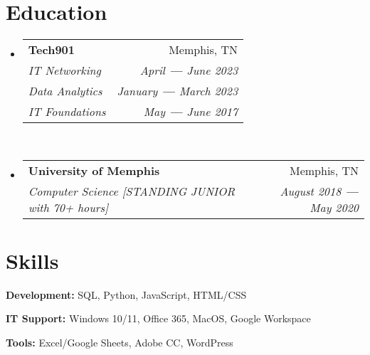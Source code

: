 \documentclass[letterpaper,10pt]{article}
\makeatletter
\newcommand{\resumeSubheading}[4]{\vspace{-2pt}\item
	\begin{tabular*}{0.97\textwidth}[t]{l@{\extracolsep{\fill}}r}
		\textbf{#1} & #2 \\
		\textit{\small#3} & \textit{\small #4} \\
	\end{tabular*}\vspace{-7pt}
}
\newcommand{\resumeEducationHeading}[8]{
	\vspace{-2pt}\item
	\begin{tabular*}{0.97\textwidth}[t]{l@{\extracolsep{\fill}}r}
		\textbf{#1} & #2 \\
		\textit{\small#3} & \textit{\small #4} \\
		\textit{\small#5} & \textit{\small #6} \\
		\textit{\small#7} & \textit{\small #8} \\
	\end{tabular*}\vspace{-5pt}
}
\newcommand{\resumeSubHeadingListStart}{\begin{itemize}[leftmargin=0.15in, label={}]}
\newcommand{\resumeSubHeadingListEnd}{\end{itemize}}
\makeatother
\begin{document}
\section{Education}
	\resumeSubHeadingListStart
		\resumeEducationHeading {Tech901}{Memphis, TN} {IT Networking}{April \textbf{—} June 2023} {Data Analytics}{January \textbf{—} March 2023} {IT Foundations}{May \textbf{—} June 2017} \\ \vspace{7pt}
		\resumeSubheading {University of Memphis}{Memphis, TN}{Computer Science [STANDING JUNIOR with 70+ hours]}{August 2018 \textbf{—} May 2020}\resumeSubHeadingListEnd

\section{Skills}
	\resumeSubHeadingListStart
		\small{\item{
        \textbf{Development: }{SQL, Python, JavaScript, HTML/CSS} \\ \vspace{3pt}
        
        \textbf{IT Support: }{Windows 10/11, Office 365, MacOS, Google Workspace} \\ \vspace{3pt}
        
        \textbf{Tools: }{Excel/Google Sheets, Adobe CC, WordPress}

 }}
\resumeSubHeadingListEnd
\end{document}
